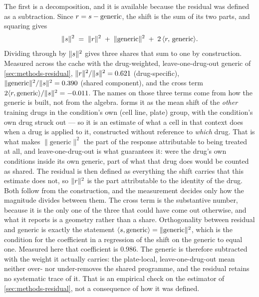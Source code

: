 The first is a decomposition, and it is available because the residual was defined
as a subtraction.  Since $r = s - \textrm{generic}$, the shift is the sum
of its two parts, and squaring gives
\begin{equation}
 \lVert s \rVert^{2}
 \;=\; \lVert r \rVert^{2}
 \;+\; \lVert \textrm{generic} \rVert^{2}
 \;+\; 2\,\langle r,\, \textrm{generic} \rangle .
\end{equation}
Dividing through by $\lVert s \rVert^{2}$ gives three shares that sum to one
by construction. Measured across the cache with the drug-weighted, leave-one-drug-out generic of \cref{sec:methods-residual},
$\lVert r \rVert^{2} / \lVert s \rVert^{2} = 0.621$ (drug-specific),
$\lVert \textrm{generic} \rVert^{2} / \lVert s \rVert^{2} = 0.390$ (shared component), and the
cross term $2\langle r, \textrm{generic}\rangle / \lVert s \rVert^{2}
= -0.011$. The names on those three terms come from how the generic is built, not from the
algebra.  forms it as the mean shift of the \emph{other}
training drugs in the condition's own (cell line, plate) group, with the
condition's own drug struck out --- so it is an estimate of what a cell in that
context does when a drug is applied to it, constructed without reference to
\emph{which} drug. That is what makes $\lVert \textrm{generic} \rVert^{2}$ the part
of the response attributable to being treated at all, and leave-one-drug-out is
what guarantees it: were the drug's own conditions inside its own generic, part of
what that drug does would be counted as shared. The residual is then defined as
everything the shift carries that this estimate does not, so
$\lVert r \rVert^{2}$ is the part attributable to the identity of the drug. Both follow from the construction, and the measurement
decides only how the magnitude divides between them. 
The cross term is the substantive number, because it is the only one of the three that could have come out otherwise, and what it reports is a geometry rather than a share. Orthogonality between residual and generic is exactly the statement
$\langle s, \textrm{generic}\rangle = \lVert \textrm{generic} \rVert^{2}$,
which is the condition for the coefficient in a regression of the shift on the
generic to equal one. Measured here that coefficient is $0.986$. The generic is therefore subtracted with the weight it actually carries: the plate-local, leave-one-drug-out mean neither over- nor under-removes the shared programme, and the residual retains no systematic trace of it. That is an empirical check on the estimator of \cref{sec:methods-residual}, not a consequence of how it was defined.

